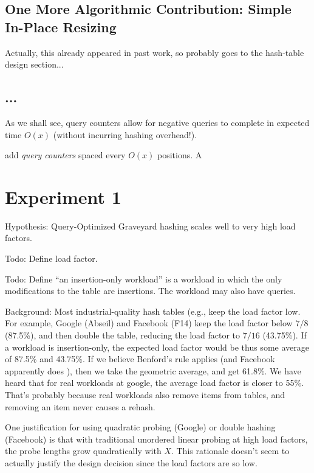 \documentclass[10pt]{article}
\theoremstyle{remark}
\theoremstyle{remark}
\begin{document}

\subsection{One More Algorithmic Contribution: Simple In-Place Resizing}

Actually, this already appeared in past work, so probably goes to the hash-table design section...


\subsection{...}





As we shall see, query counters allow for negative queries to complete in expected time $O(x)$ (without incurring hashing overhead!). 


add \emph{query counters} spaced every $O(x)$ positions. A 


\section{Experiment 1}

Hypothesis: Query-Optimized Graveyard hashing scales well to very high
load factors.

Todo: Define load factor.

Todo: Define ``an insertion-only workload'' is a workload in which the
only modifications to the table are insertions.  The workload may also
have queries.

Background: Most industrial-quality hash tables (e.g., \cite{Abseil17,
  BronsonSh19} keep the load factor low.  For example, Google (Abseil)
and Facebook (F14) keep the load factor below $7/8$ (87.5\%), and then
double the table, reducing the load factor to $7/16$ (43.75\%).  If a
workload is insertion-only, the expected load factor would be thus
some average of 87.5\% and 43.75\%.  If we believe Benford's rule
\cite{Benford38} applies (and Facebook apparently does
\cite{BronsonSh19}), then we take the geometric average, and get
61.8\%.  We have heard that for real workloads at google, the average
load factor is closer to 55\%.  That's probably because real workloads
also remove items from tables, and removing an item never causes a
rehash.

One justification for using quadratic probing (Google) or double
hashing (Facebook) is that with traditional unordered linear probing
at high load factors, the probe lengths grow quadratically with $X$.
This rationale doesn't seem to actually justify the design decision
since the load factors are so low.
\end{document}
